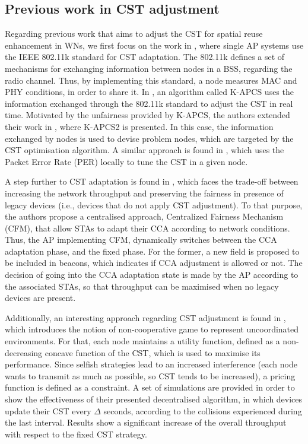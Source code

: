 \documentclass[12pt, a4paper,twoside]{tesi_upf}
\begin{document}
			\subsection{Previous work in CST adjustment}
			\label{section:other_cst}
				Regarding previous work that aims to adjust the CST for spatial reuse enhancement in WNs, we first focus on the work in \cite{thorpe2009ieee802, thorpe2011ieee802}, where single AP systems use the IEEE 802.11k standard \cite{ieee2002ieee} for CST adaptation. The 802.11k defines a set of mechanisms for exchanging information between nodes in a BSS, regarding the radio channel. Thus, by implementing this standard, a node measures MAC and PHY conditions, in order to share it. In \cite{thorpe2009ieee802}, an algorithm called K-APCS uses the information exchanged through the 802.11k standard to adjust the CST in real time. Motivated by the unfairness provided by K-APCS, the authors extended their work in \cite{thorpe2011ieee802}, where K-APCS2 is presented. In this case, the information exchanged by nodes is used to devise problem nodes, which are targeted by the CST optimisation algorithm. A similar approach is found in \cite{zhu2006adaptive}, which uses the Packet Error Rate (PER) locally to tune the CST in a given node. 
				
				A step further to CST adaptation is found in \cite{afifi2016throughput}, which faces the trade-off between increasing the network throughput and preserving the fairness in presence of legacy devices (i.e., devices that do not apply CST adjustment). To that purpose, the authors propose a centralised approach, Centralized Fairness Mechanism (CFM), that allow STAs to adapt their CCA according to network conditions. Thus, the AP implementing CFM, dynamically switches between the CCA adaptation phase, and the fixed phase. For the former, a new field is proposed to be included in beacons, which indicates if CCA adjustment is allowed or not. The decision of going into the CCA adaptation state is made by the AP according to the associated STAs, so that throughput can be maximised when no legacy devices are present.
				
				Additionally, an interesting approach regarding CST adjustment is found in \cite{park2009noncooperative}, which introduces the notion of non-cooperative game to represent uncoordinated environments. For that, each node maintains a utility function, defined as a non-decreasing concave function of the CST, which is used to maximise its performance. Since selfish strategies lead to an increased interference (each node wants to transmit as much as possible, so CST tends to be increased), a pricing function is defined as a constraint. A set of simulations are provided in order to show the effectiveness of their presented decentralised algorithm, in which devices update their CST every $\Delta$ seconds, according to the collisions experienced during the last interval. Results show a significant increase of the overall throughput with respect to the fixed CST strategy.
				
\end{document}
